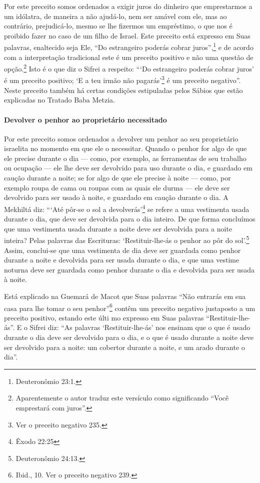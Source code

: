 Por este preceito somos ordenados a exigir juros do dinheiro que
emprestarmos a um idólatra, de maneira a não ajudá-lo, nem ser amável
com ele, mas ao contrário, prejudicá-lo, mesmo se lhe fizermos um
empréstimo, o
que nos é proibido fazer no caso de um filho de Israel. Este preceito
está expresso em Suas palavras, enaltecido seja Ele, ``Do estrangeiro poderás
cobrar juros'',\footnote{Deuteronômio 23:1.} e de acordo com a interpretação
tradicional este
é um preceito positivo e não uma questão de opção.\footnote{Aparentemente o autor traduz este versículo como significando ``Você
  emprestará com juros''.}
Isto é o que diz o Sifrei a respeito: ```Do estrangeiro poderás cobrar juros' é um preceito positivo;
`E a teu irmão não pagarás'\footnote{Ver o preceito negativo 235.} é um preceito
negativo''. Neste preceito também
há certas condições estipuladas pelos Sábios que estão explicadas no
Tratado Baba Metzia.

\paragraph{Devolver o penhor ao proprietário necessitado}

Por este preceito somos ordenados a devolver um penhor ao seu
proprietário israelita no momento em que ele o necessitar. Quando o
penhor for algo de que ele precise durante o dia --- como, por exemplo,
as ferramentas de seu trabalho ou ocupação --- ele lhe deve ser
devolvido para uso durante o dia, e guardado em caução durante a noite;
se for algo de que ele precise à noite --- como, por exemplo roupa de
cama ou roupas com as quais ele durma --- ele deve ser devolvido para ser usado à noite, e guardado em caução
durante o dia. A Mekhiltá diz: ```Até pôr-se o sol a devolverás'\footnote{Êxodo
22:25} se refere a uma vestimenta usada durante o dia, que deve ser
devolvida para o dia inteiro. De que forma concluímos que uma vestimenta
usada durante a noite deve ser devolvida para a noite inteira? Pelas
palavras das Escrituras: `Restituir-lhe-ás o penhor ao pôr do sol'.\footnote{Deuteronômio 24:13.} Assim, conclui-se que uma vestimenta de dia deve
ser guardada como penhor durante a noite e devolvida para ser usada
durante o dia, e que uma vestime noturna deve ser guardada como penhor
durante o dia e devolvida para ser usada à noite.


Está explicado na Guemará de Macot que Suas palavras ``Não entrarás em sua casa para lhe tomar o seu penhor''\footnote{Ibid., 10. Ver o preceito negativo 239.} contêm um preceito
negativo justaposto a um preceito positivo, estando este últi mo
expresso em Suas palavras ``Restituir-lhe-ás''. E o Sifrei diz: ``As palavras
`Restituir-lhe-ás' nos
ensinam que o que é usado durante o dia deve ser devolvido para o dia, e
o que é usado durante a noite deve ser devolvido para a noite: um
cobertor durante a noite, e um arado durante o dia''.

